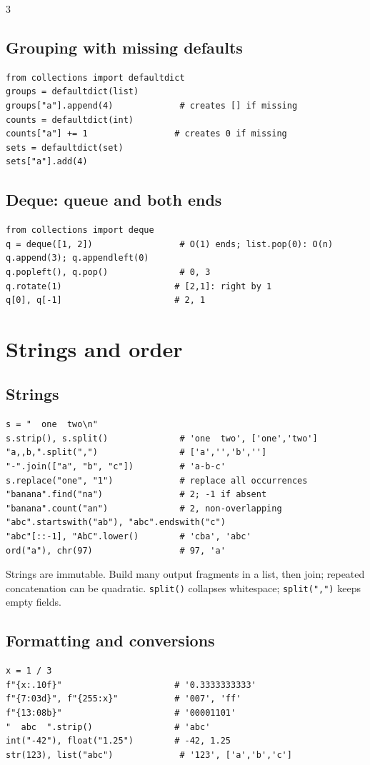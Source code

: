 \documentclass[9pt]{extarticle}
\let\referenceSubsection\subsection
\renewcommand{\subsection}{\needspace{4\baselineskip}\referenceSubsection}
\newcommand{\hint}[1]{{\small #1\par}}
\begin{document}
\begin{multicols*}{3}
\subsection{Grouping with missing defaults}
\begin{lstlisting}[label=py:defaultdict]
from collections import defaultdict
groups = defaultdict(list)
groups["a"].append(4)             # creates [] if missing
counts = defaultdict(int)
counts["a"] += 1                 # creates 0 if missing
sets = defaultdict(set)
sets["a"].add(4)
\end{lstlisting}

\subsection{Deque: queue and both ends}
\begin{lstlisting}[label=py:deque]
from collections import deque
q = deque([1, 2])                 # O(1) ends; list.pop(0): O(n)
q.append(3); q.appendleft(0)
q.popleft(), q.pop()              # 0, 3
q.rotate(1)                      # [2,1]: right by 1
q[0], q[-1]                      # 2, 1
\end{lstlisting}



\section{Strings and order}

\subsection{Strings}
\begin{lstlisting}[label=py:strings]
s = "  one  two\n"
s.strip(), s.split()              # 'one  two', ['one','two']
"a,,b,".split(",")                # ['a','','b','']
"-".join(["a", "b", "c"])         # 'a-b-c'
s.replace("one", "1")             # replace all occurrences
"banana".find("na")               # 2; -1 if absent
"banana".count("an")              # 2, non-overlapping
"abc".startswith("ab"), "abc".endswith("c")
"abc"[::-1], "AbC".lower()        # 'cba', 'abc'
ord("a"), chr(97)                 # 97, 'a'
\end{lstlisting}
\hint{Strings are immutable. Build many output fragments in a list,
then join; repeated concatenation can be quadratic.
\texttt{split()} collapses whitespace; \texttt{split(",")} keeps
empty fields.}

\subsection{Formatting and conversions}
\begin{lstlisting}[label=py:format]
x = 1 / 3
f"{x:.10f}"                      # '0.3333333333'
f"{7:03d}", f"{255:x}"           # '007', 'ff'
f"{13:08b}"                      # '00001101'
"  abc  ".strip()                # 'abc'
int("-42"), float("1.25")        # -42, 1.25
str(123), list("abc")             # '123', ['a','b','c']
\end{lstlisting}


\end{multicols*}
\end{document}
